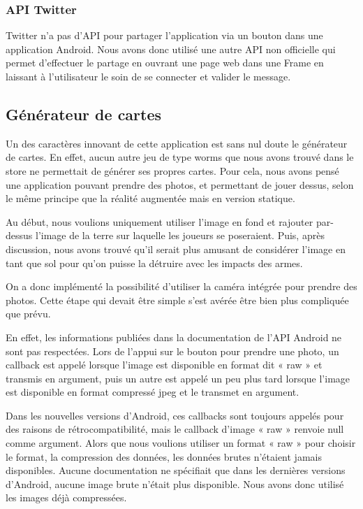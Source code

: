 \documentclass{report}
\begin{document}
\subsubsection{API Twitter}

Twitter n’a pas d’API pour partager l’application via un bouton dans une
application Android. Nous avons donc utilisé une autre API non
officielle qui permet d’effectuer le partage en ouvrant une page web
 dans une Frame en laissant à l’utilisateur le soin de se connecter et
 valider le message.

\subsection{Générateur de cartes}
\bigskip


Un des caractères innovant de cette application est sans nul doute le
générateur de cartes.
En effet, aucun autre jeu de type worms que nous avons trouvé dans le
store ne permettait de générer ses propres cartes. Pour cela, nous avons
pensé une application pouvant prendre des photos, et permettant de jouer
dessus, selon le même principe que la réalité augmentée mais en version
statique.
\bigskip

Au début, nous voulions uniquement utiliser l'image en fond et rajouter
par-dessus l'image de la terre sur laquelle les joueurs se poseraient.
Puis, après discussion, nous avons trouvé qu'il serait plus amusant de
considérer l'image en tant que sol pour qu'on puisse la détruire avec
les impacts des armes.
\bigskip

On a donc implémenté la possibilité d'utiliser la caméra intégrée pour
prendre des photos. Cette étape qui devait être simple s'est avérée être
bien plus compliquée que prévu.

En effet, les informations publiées dans
la documentation de l'API Android ne sont pas respectées. Lors de
l'appui sur le bouton pour prendre une photo, un callback est appelé
lorsque l'image est disponible en format dit « raw » et transmis en
argument, puis un autre est appelé un peu plus tard lorsque l'image est
disponible en format compressé jpeg et le transmet en argument.

Dans les nouvelles versions d'Android, ces callbacks sont toujours
appelés pour des raisons de rétrocompatibilité, mais le callback
d'image « raw » renvoie null comme argument. Alors que nous voulions
utiliser un format « raw » pour choisir le format, la compression des
données, les données brutes n'étaient jamais disponibles. Aucune
documentation ne spécifiait que dans les dernières versions d'Android,
aucune image brute n'était plus disponible. Nous avons donc utilisé les
images déjà compressées.
\bigskip
\end{document}
